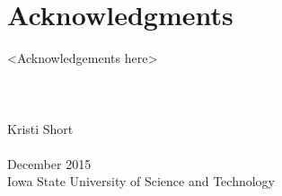 \cleardoublepage
{}
{}
\chapter*{Acknowledgments}
\vspace{1.0in}
<Acknowledgements here>
\\
\\
\\ 
\\
Kristi Short \\ 
\\
December 2015\\
{Iowa State University of Science and Technology}\\
\newpage
